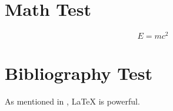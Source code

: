 \documentclass{ui1activity}
\begin{document}
\makecustomcover

\tableofcontents

\newpage

\section{Math Test}
\begin{equation}
	E = mc^2
\end{equation}

\section{Bibliography Test}
As mentioned in \cite{sample}, LaTeX is powerful.

\makebibliography
\end{document}

